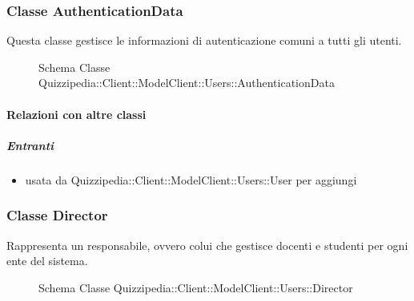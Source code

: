 \subsubsection{Classe AuthenticationData}
Questa classe gestisce le informazioni di autenticazione comuni a tutti gli utenti.
\begin{figure}[H]
\centering
\noindent{}
\caption[Schema Classe AuthenticationData]{Schema Classe Quizzipedia::Client::ModelClient::Users::AuthenticationData}
\end{figure}
\paragraph{Relazioni con altre classi}
\subparagraph{Entranti}
\begin{itemize}
\item usata da Quizzipedia::Client::ModelClient::Users::User per aggiungi
\end{itemize}
\subsubsection{Classe Director}
Rappresenta un responsabile, ovvero colui che gestisce docenti e studenti per ogni ente del sistema.
\begin{figure}[H]
\centering
\noindent{}
\caption[Schema Classe Director]{Schema Classe Quizzipedia::Client::ModelClient::Users::Director}
\end{figure}
